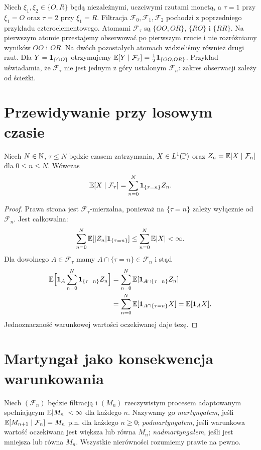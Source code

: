 \begin{przyklad}
Niech $\xi_1,\xi_2\in\{O,R\}$ będą niezależnymi,
uczciwymi rzutami monetą, a
$\tau=1$ przy $\xi_1=O$ oraz $\tau=2$ przy $\xi_1=R$.
Filtracja $\mathcal F_0,\mathcal F_1,\mathcal F_2$
pochodzi z poprzedniego przykładu czteroelementowego.
Atomami $\mathcal F_\tau$ są
$\{OO,OR\}$, $\{RO\}$ i $\{RR\}$.
Na pierwszym atomie przestajemy obserwować po
pierwszym rzucie i nie rozróżniamy wyników
$OO$ i $OR$. Na dwóch pozostałych atomach
widzieliśmy również drugi rzut.
Dla $Y=\mathbf{1}_{\{OO\}}$ otrzymujemy
$\mathbb{E}[Y\mid\mathcal F_\tau]
=\frac12\mathbf{1}_{\{OO,OR\}}$.
Przykład uświadamia, że $\mathcal F_\tau$ nie jest
jednym z góry ustalonym $\mathcal F_n$:
zakres obserwacji zależy od ścieżki.
\end{przyklad}

\section{Przewidywanie przy losowym czasie}

\begin{twierdzenie}
Niech $N\in\mathbb{N}$, $\tau\leq N$ będzie czasem
zatrzymania, $X\in L^1(\mathbb{P})$ oraz
$Z_n=\mathbb{E}[X\mid\mathcal F_n]$ dla $0\leq n\leq N$.
Wówczas
\[
\mathbb{E}[X\mid\mathcal F_\tau]
=\sum_{n=0}^N\mathbf{1}_{\{\tau=n\}}Z_n.
\]
\end{twierdzenie}
\begin{proof}
Prawa strona jest $\mathcal F_\tau$-mierzalna,
ponieważ na $\{\tau=n\}$ zależy wyłącznie
od $\mathcal F_n$. Jest całkowalna:
\[
\sum_{n=0}^N\mathbb{E}[|Z_n|\mathbf{1}_{\{\tau=n\}}]
\leq\sum_{n=0}^N\mathbb{E}|X|<\infty.
\]
Dla dowolnego $A\in\mathcal F_\tau$ mamy
$A\cap\{\tau=n\}\in\mathcal F_n$ i stąd
\begin{align*}
\mathbb{E}\Bigl[\mathbf{1}_{A}\sum_{n=0}^N
\mathbf{1}_{\{\tau=n\}}Z_n\Bigr]
&=\sum_{n=0}^N\mathbb{E}[\mathbf{1}_{A\cap\{\tau=n\}}Z_n]\\
&=\sum_{n=0}^N\mathbb{E}[\mathbf{1}_{A\cap\{\tau=n\}}X]
=\mathbb{E}[\mathbf{1}_{A} X].
\end{align*}
Jednoznaczność warunkowej wartości oczekiwanej
daje tezę.
\end{proof}

\section{Martyngał jako konsekwencja warunkowania}

\begin{definicja}
Niech $(\mathcal F_n)$ będzie filtracją i
$(M_n)$ rzeczywistym procesem adaptowanym
spełniającym $\mathbb{E}|M_n|<\infty$ dla każdego $n$.
Nazywamy go \emph{martyngałem}, jeśli
$\mathbb{E}[M_{n+1}\mid\mathcal F_n]=M_n$ p.n.
dla każdego $n\geq0$;
\emph{podmartyngałem}, jeśli warunkowa wartość
oczekiwana jest większa lub równa $M_n$;
\emph{nadmartyngałem}, jeśli jest mniejsza
lub równa $M_n$. Wszystkie nierówności
rozumiemy prawie na pewno.
\end{definicja}

